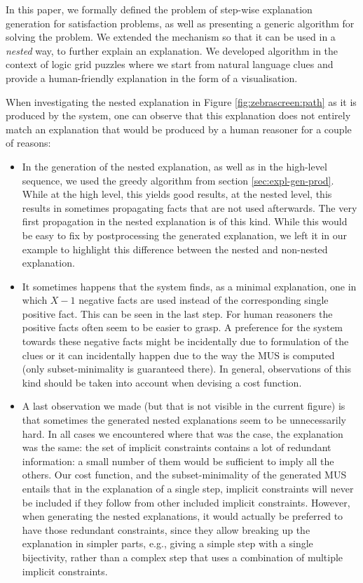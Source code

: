 In this paper, we formally defined the problem of step-wise explanation generation for satisfaction problems, as well as presenting a generic algorithm for solving the problem. We extended the mechanism so that it can be used in a \textit{nested} way, to further explain an explanation.
We developed algorithm in the context of logic grid puzzles where we start from natural language clues and provide a human-friendly explanation in the form of a visualisation. 

%
When investigating the nested explanation in Figure \ref{fig:zebrascreen:path} as it is produced by the system, one can observe that this explanation does not entirely match an explanation that would be produced by a human reasoner for a couple of reasons: 
\begin{itemize}
 \item In the generation of the nested explanation, as well as in the high-level sequence, we used the greedy algorithm from section \ref{sec:expl-gen-prod}. 
 While at the high level, this yields good results, at the nested level, this results in sometimes propagating facts that are not used afterwards. 
 The very first propagation in the nested explanation is of this kind.
 While this would be easy to fix by postprocessing the generated explanation, we left it in our example to highlight this difference between the nested and non-nested explanation. 
 \item It sometimes happens that the system finds, as a minimal explanation, one in which $X-1$ negative facts are used instead of the corresponding single positive fact. This can be seen in the last step. For human reasoners the positive facts often seem to be easier to grasp. A preference for the system towards these negative facts might be incidentally due to formulation of the clues or it can incidentally happen due to the way the MUS is computed (only subset-minimality is guaranteed there). 
 In general, observations of this kind should be taken into account when devising a cost function. 
 \item A last observation we made (but that is not visible in the current figure) is that sometimes the generated nested explanations seem to be unnecessarily hard. In all cases we encountered where that was the case, the explanation was the same: the set of implicit constraints contains a lot of redundant information: a small number of them would be sufficient to imply all the others. Our cost function, and the subset-minimality of the generated MUS entails that in the explanation of a single step, implicit constraints will never be included if they follow from other included implicit constraints. However, when generating the nested explanations, it would actually be preferred to have those redundant constraints, since they allow breaking up the explanation in simpler parts, e.g., giving a simple step with a single bijectivity, rather than a complex step that uses a combination of multiple implicit constraints.
\end{itemize}
